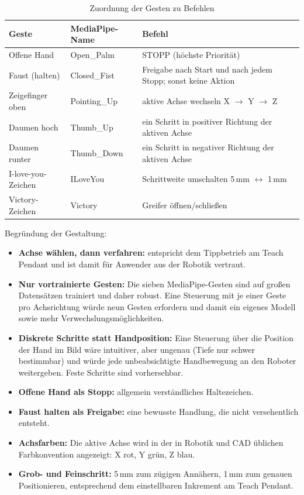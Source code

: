 \documentclass[11pt,a4paper]{article}
\begin{document}
\begin{table}[H]
\centering
\begin{tabularx}{\textwidth}{>{\raggedright\arraybackslash}p{3.6cm}>{\raggedright\arraybackslash}p{3.2cm}>{\raggedright\arraybackslash}X}
\toprule
Geste & MediaPipe-Name & Befehl \\
\midrule
Offene Hand & Open\_Palm & STOPP (höchste Priorität) \\
Faust (halten) & Closed\_Fist & Freigabe nach Start und nach jedem Stopp; sonst keine Aktion \\
Zeigefinger oben & Pointing\_Up & aktive Achse wechseln X $\rightarrow$ Y $\rightarrow$ Z \\
Daumen hoch & Thumb\_Up & ein Schritt in positiver Richtung der aktiven Achse \\
Daumen runter & Thumb\_Down & ein Schritt in negativer Richtung der aktiven Achse \\
I-love-you-Zeichen & ILoveYou & Schrittweite umschalten 5\,mm $\leftrightarrow$ 1\,mm \\
Victory-Zeichen & Victory & Greifer öffnen/schließen \\
\bottomrule
\end{tabularx}
\caption{Zuordnung der Gesten zu Befehlen}
\label{tab:gesten}
\end{table}

Begründung der Gestaltung:
\begin{itemize}
  \item \textbf{Achse wählen, dann verfahren:} entspricht dem Tippbetrieb am Teach Pendant und ist
        damit für Anwender aus der Robotik vertraut.
  \item \textbf{Nur vortrainierte Gesten:} Die sieben MediaPipe-Gesten sind auf großen Datensätzen
        trainiert und daher robust. Eine Steuerung mit je einer Geste pro Achsrichtung würde neun
        Gesten erfordern und damit ein eigenes Modell sowie mehr Verwechslungsmöglichkeiten.
  \item \textbf{Diskrete Schritte statt Handposition:} Eine Steuerung über die Position der Hand im
        Bild wäre intuitiver, aber ungenau (Tiefe nur schwer bestimmbar) und würde jede unbeabsichtigte
        Handbewegung an den Roboter weitergeben. Feste Schritte sind vorhersehbar.
  \item \textbf{Offene Hand als Stopp:} allgemein verständliches Haltezeichen.
  \item \textbf{Faust halten als Freigabe:} eine bewusste Handlung, die nicht versehentlich entsteht.
  \item \textbf{Achsfarben:} Die aktive Achse wird in der in Robotik und CAD üblichen Farbkonvention
        angezeigt: X rot, Y grün, Z blau.
  \item \textbf{Grob- und Feinschritt:} 5\,mm zum zügigen Annähern, 1\,mm zum genauen Positionieren,
        entsprechend dem einstellbaren Inkrement am Teach Pendant.
\end{itemize}
\end{document}
